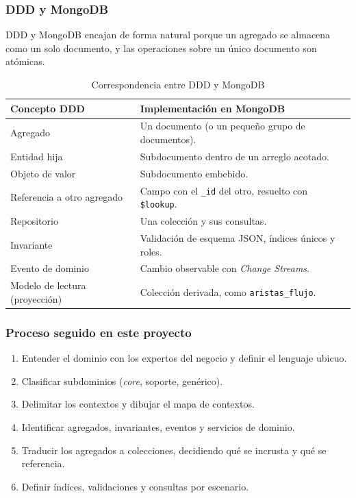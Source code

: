 \documentclass[11pt,a4paper]{article}
\begin{document}
	\subsubsection{DDD y MongoDB}
	DDD y MongoDB encajan de forma natural porque un agregado se almacena como un solo documento, y las operaciones sobre un único documento son atómicas.
	
	\begin{table}[H]
		\centering
		\caption{Correspondencia entre DDD y MongoDB}
		\small
		\begin{tabularx}{\textwidth}{>{\raggedright\arraybackslash}p{5cm}Y}
			\toprule
			\textbf{Concepto DDD} & \textbf{Implementación en MongoDB} \\
			\midrule
			Agregado & Un documento (o un pequeño grupo de documentos). \\
			Entidad hija & Subdocumento dentro de un arreglo acotado. \\
			Objeto de valor & Subdocumento embebido. \\
			Referencia a otro agregado & Campo con el \texttt{\_id} del otro, resuelto con \texttt{\$lookup}. \\
			Repositorio & Una colección y sus consultas. \\
			Invariante & Validación de esquema JSON, índices únicos y roles. \\
			Evento de dominio & Cambio observable con \textit{Change Streams}. \\
			Modelo de lectura (proyección) & Colección derivada, como \texttt{aristas\_flujo}. \\
			\bottomrule
		\end{tabularx}
	\end{table}
	
	\subsubsection{Proceso seguido en este proyecto}
	\begin{enumerate}[leftmargin=2em]
		\item Entender el dominio con los expertos del negocio y definir el lenguaje ubicuo.
		\item Clasificar subdominios (\textit{core}, soporte, genérico).
		\item Delimitar los contextos y dibujar el mapa de contextos.
		\item Identificar agregados, invariantes, eventos y servicios de dominio.
		\item Traducir los agregados a colecciones, decidiendo qué se incrusta y qué se referencia.
		\item Definir índices, validaciones y consultas por escenario.
	\end{enumerate}
	
\end{document}
